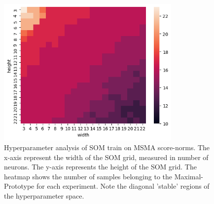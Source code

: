 \begin{figure}[tbhp]
\centering
\includegraphics[width=0.8\textwidth]{figures/somhparams.png}
\caption{Hyperparameter analysis of SOM train on MSMA score-norms. The x-axis represent the width of the SOM grid, measured in number of neurons. The y-axis represents the height of the SOM grid. The heatmap shows the number of samples belonging to the Maximal-Prototype for each experiment. Note the diagonal 'stable' regions of the hyperparameter space.}
\label{fig:som-hparams}
\end{figure}



